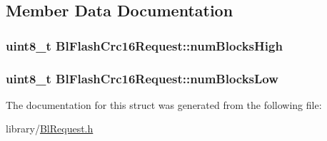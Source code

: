 \subsection{Member Data Documentation}
\hypertarget{struct_bl_flash_crc16_request_a99771cedf57ffdd7a1933caad05c56b8}{
\subsubsection[{num\-Blocks\-High}]{\setlength{\rightskip}{0pt plus 5cm}uint8\-\_\-t Bl\-Flash\-Crc16\-Request\-::num\-Blocks\-High}}\label{struct_bl_flash_crc16_request_a99771cedf57ffdd7a1933caad05c56b8}
\hypertarget{struct_bl_flash_crc16_request_a9bf380a0e7aae6cb05f382c7dbf0f659}{
\subsubsection[{num\-Blocks\-Low}]{\setlength{\rightskip}{0pt plus 5cm}uint8\-\_\-t Bl\-Flash\-Crc16\-Request\-::num\-Blocks\-Low}}\label{struct_bl_flash_crc16_request_a9bf380a0e7aae6cb05f382c7dbf0f659}


The documentation for this struct was generated from the following file\-:\begin{DoxyCompactItemize}
\item 
library/\hyperlink{_bl_request_8h}{Bl\-Request.\-h}\end{DoxyCompactItemize}
